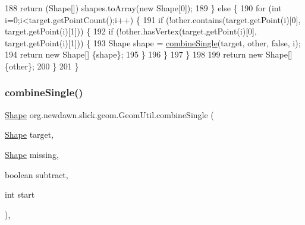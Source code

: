 \begin{DoxyCode}
188             \textcolor{keywordflow}{return} (Shape[]) shapes.toArray(\textcolor{keyword}{new} Shape[0]);
189         \} \textcolor{keywordflow}{else} \{
190             \textcolor{keywordflow}{for} (\textcolor{keywordtype}{int} i=0;i<target.getPointCount();i++) \{
191                 \textcolor{keywordflow}{if} (!other.contains(target.getPoint(i)[0], target.getPoint(i)[1])) \{
192                     \textcolor{keywordflow}{if} (!other.hasVertex(target.getPoint(i)[0], target.getPoint(i)[1])) \{
193                         Shape shape = \mbox{\hyperlink{classorg_1_1newdawn_1_1slick_1_1geom_1_1_geom_util_a3aea00a7563f7885b2eadff26ec37014}{combineSingle}}(target, other, \textcolor{keyword}{false}, i);
194                         \textcolor{keywordflow}{return} \textcolor{keyword}{new} Shape[] \{shape\};
195                     \}
196                 \}
197             \}
198             
199             \textcolor{keywordflow}{return} \textcolor{keyword}{new} Shape[] \{other\};
200         \}
201     \}
\end{DoxyCode}
\mbox{\label{classorg_1_1newdawn_1_1slick_1_1geom_1_1_geom_util_a3aea00a7563f7885b2eadff26ec37014}} 
\subsubsection{\texorpdfstring{combine\+Single()}{combineSingle()}}
{\footnotesize\ttfamily \mbox{\hyperlink{classorg_1_1newdawn_1_1slick_1_1geom_1_1_shape}{Shape}} org.\+newdawn.\+slick.\+geom.\+Geom\+Util.\+combine\+Single (\begin{DoxyParamCaption}\item[{\mbox{\hyperlink{classorg_1_1newdawn_1_1slick_1_1geom_1_1_shape}{Shape}}}]{target,  }\item[{\mbox{\hyperlink{classorg_1_1newdawn_1_1slick_1_1geom_1_1_shape}{Shape}}}]{missing,  }\item[{boolean}]{subtract,  }\item[{int}]{start }\end{DoxyParamCaption})\hspace{0.3cm}{\ttfamily [inline]}, {\ttfamily [private]}}

